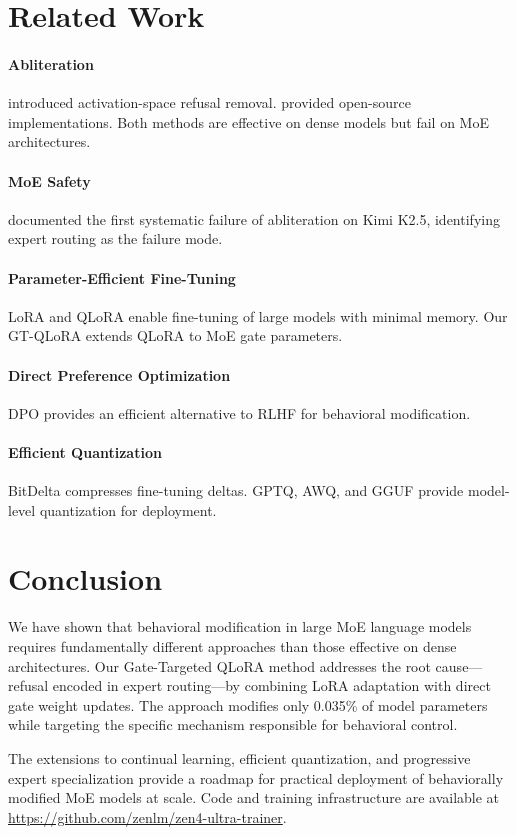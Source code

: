 \documentclass[11pt,a4paper]{article}
\begin{document}
\section{Related Work}

\paragraph{Abliteration} \citet{arditi2024refusal} introduced activation-space refusal removal. \citet{sumandora2024} provided open-source implementations. Both methods are effective on dense models but fail on MoE architectures.

\paragraph{MoE Safety} \citet{hamsaomar2025} documented the first systematic failure of abliteration on Kimi K2.5, identifying expert routing as the failure mode.

\paragraph{Parameter-Efficient Fine-Tuning} LoRA \citep{hu2022lora} and QLoRA \citep{dettmers2023qlora} enable fine-tuning of large models with minimal memory. Our GT-QLoRA extends QLoRA to MoE gate parameters.

\paragraph{Direct Preference Optimization} DPO \citep{rafailov2023direct} provides an efficient alternative to RLHF for behavioral modification.

\paragraph{Efficient Quantization} BitDelta \citep{liu2024bitdelta} compresses fine-tuning deltas. GPTQ, AWQ, and GGUF provide model-level quantization for deployment.

\section{Conclusion}

We have shown that behavioral modification in large MoE language models requires fundamentally different approaches than those effective on dense architectures. Our Gate-Targeted QLoRA method addresses the root cause—refusal encoded in expert routing—by combining LoRA adaptation with direct gate weight updates. The approach modifies only 0.035\% of model parameters while targeting the specific mechanism responsible for behavioral control.

The extensions to continual learning, efficient quantization, and progressive expert specialization provide a roadmap for practical deployment of behaviorally modified MoE models at scale. Code and training infrastructure are available at \url{https://github.com/zenlm/zen4-ultra-trainer}.



\end{document}
